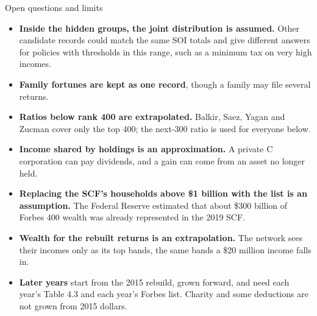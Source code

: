 \begin{frame}{Open questions and limits}
  \footnotesize
  \begin{itemize}
    \item \textbf{Inside the hidden groups, the joint distribution is assumed.} Other candidate records
          could match the same SOI totals and give different answers for policies with thresholds in this
          range, such as a minimum tax on very high incomes.
    \item \textbf{Family fortunes are kept as one record}, though a family may file several returns.
    \item \textbf{Ratios below rank 400 are extrapolated.} Balkir, Saez, Yagan and Zucman cover only the top 400; the next-300 ratio
          is used for everyone below.
    \item \textbf{Income shared by holdings is an approximation.} A private C corporation can pay
          dividends, and a gain can come from an asset no longer held.
    \item \textbf{Replacing the SCF's households above \$1 billion with the list is an assumption.} The
          Federal Reserve estimated that about \$300 billion of Forbes 400 wealth was already represented
          in the 2019 SCF.
    \item \textbf{Wealth for the rebuilt returns is an extrapolation.} The network sees their incomes only
          as its top bands, the same bands a \$20 million income falls in.
    \item \textbf{Later years} start from the 2015 rebuild, grown forward, and need each year's Table 4.3
          and each year's Forbes list. Charity and some deductions are not grown from 2015 dollars.
  \end{itemize}
\end{frame}


